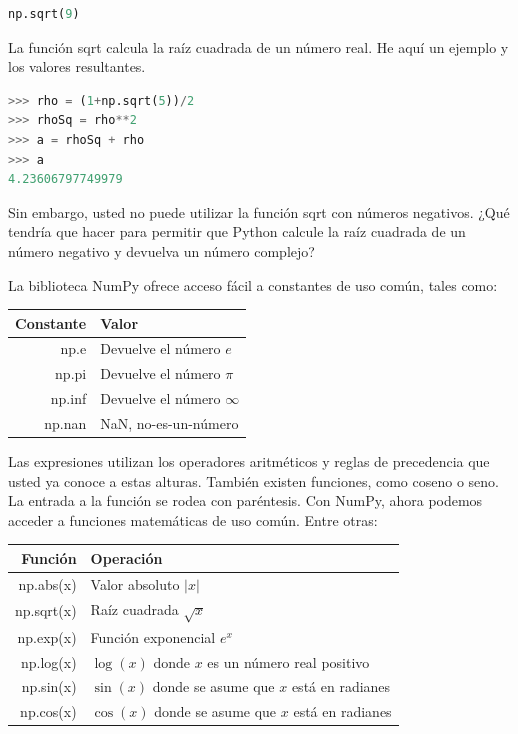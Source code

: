 \begin{lstlisting}[language=Python]
	np.sqrt(9)
\end{lstlisting}

La función {\s sqrt} calcula la raíz cuadrada de un número real. He aquí un ejemplo y los valores resultantes.

\begin{lstlisting}[language=Python]
>>> rho = (1+np.sqrt(5))/2
>>> rhoSq = rho**2
>>> a = rhoSq + rho
>>> a
4.23606797749979
\end{lstlisting}

Sin embargo, usted no puede utilizar la función {\s sqrt} con números negativos. ¿Qué tendría que hacer para permitir que Python calcule la raíz cuadrada de un número negativo y devuelva un número complejo? \QA %


La biblioteca NumPy ofrece acceso fácil a constantes de uso común, tales como:

\vs

\begin{tabular}{r|l}
Constante 		& Valor\\
\hline
{\s np.e} 		& Devuelve el número $e$ \\
{\s np.pi} 		& Devuelve el número $\pi$ \\
{\s np.inf} 	& Devuelve el número $\infty$ \\
{\s np.nan} 	& NaN, no-es-un-número \\
\hline
\end{tabular}

\vs



Las expresiones utilizan los operadores aritméticos y reglas de precedencia que usted ya conoce a estas alturas. También existen funciones, como coseno o seno. La entrada a la función se rodea con paréntesis. Con NumPy, ahora podemos acceder a funciones matemáticas de uso común. Entre otras: \vs

\begin{tabular}{r|l}
Función 			& Operación \\
\hline
{\s np.abs(x)} 		& Valor absoluto $|x|$ \\
{\s np.sqrt(x)}		&  Raíz cuadrada $\sqrt{x}$ \\
{\s np.exp(x)} 		& Función exponencial $e^x$ \\
{\s np.log(x)} 		& $\log(x)$ donde $x$ es un número real positivo\\
{\s np.sin(x)}		&  $\sin(x)$ donde se asume que $x$ está en radianes \\
{\s np.cos(x)}		& $\cos(x)$ donde se asume que $x$ está en radianes \\
\hline
\end{tabular}

